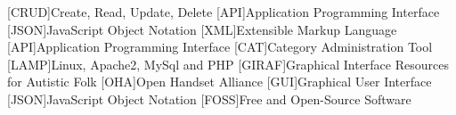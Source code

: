 [CRUD]{Create, Read, Update, Delete}
[API]{Application Programming Interface}
[JSON]{JavaScript Object Notation}
[XML]{Extensible Markup Language}
[API]{Application Programming Interface}
[CAT]{Category Administration Tool}
[LAMP]{Linux, Apache2, MySql and PHP}
[GIRAF]{Graphical Interface Resources for Autistic Folk}
[OHA]{Open Handset Alliance}
[GUI]{Graphical User Interface}
[JSON]{JavaScript Object Notation}
[FOSS]{Free and Open-Source Software}